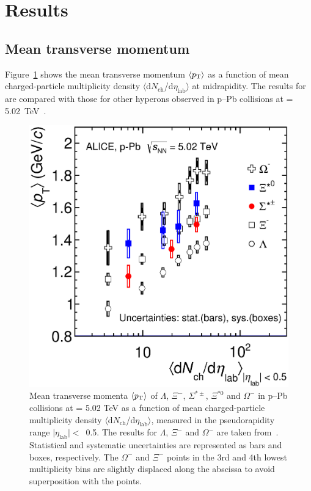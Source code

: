 \newpage
\section{Results}
\subsection{Mean transverse momentum}

Figure~\ref{fig:mean_pt_vs_mult} shows the mean transverse momentum $\langle p_{\mathrm{T}}\rangle$ as a function of mean 
charged-particle multiplicity density $\langle$d$N_{\mathrm{ch}}$/d$\eta_{\mathrm{lab}}\rangle$ at midrapidity.
The results for \xis are compared with those for other hyperons observed in p--Pb collisions at \snn = 5.02~TeV~\cite{cite:lambda_pPb, cite:Xi_pPb}.

\begin{figure}[htbp]
\begin{center}
\includegraphics[width=10.cm]{./Version1/FigChapter6/mpt/mpt_mult.eps}
\caption{Mean transverse momenta $\langle p_{\mathrm{T}}\rangle$ of $\Lambda$, $\Xi^{-}$, $\Sigma^{*\pm}$, $\Xi^{*0}$ 
  and $\Omega^{-}$ in p--Pb collisions at \snn = 5.02 TeV as a 
  function of mean charged-particle multiplicity density 
  $\langle$d$N_{\mathrm{ch}}$/d$\eta_{\mathrm{lab}}\rangle$, measured in the pseudorapidity range 
  $\mid\eta_{\mathrm{lab}}\mid <$~0.5. The results for $\Lambda$, $\Xi^{-}$ and $\Omega^{-}$ are taken 
  from~\cite{cite:lambda_pPb, cite:KphipPb, cite:Xi_pPb}. Statistical and systematic uncertainties are represented as bars 
  and boxes, respectively. The $\Omega^-$ and $\Xi^-$ points in the 3rd and 4th lowest multiplicity bins are slightly 
  displaced along the abscissa to avoid superposition with the \xis points.}
  \label{fig:mean_pt_vs_mult}
  \end{center}
\end{figure}


